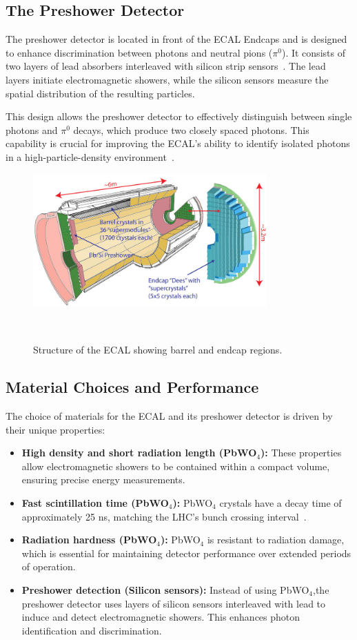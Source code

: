\subsection{The Preshower Detector}
The preshower detector is located in front of the ECAL Endcaps and is designed to enhance discrimination between photons and neutral pions ($\pi^0$). It consists of two layers of lead absorbers interleaved with silicon strip sensors~\cite{ecal_tdr_preshower}. The lead layers initiate electromagnetic showers, while the silicon sensors measure the spatial distribution of the resulting particles.

This design allows the preshower detector to effectively distinguish between single photons and $\pi^0$ decays, which produce two closely spaced photons. This capability is crucial for improving the ECAL’s ability to identify isolated photons in a high-particle-density environment~\cite{ecal_tdr_preshower}.

\begin{figure}[ht]
\centering
\includegraphics[width=0.8\textwidth]{Figures/ECAL Schematic Overview.png} %
\caption{Structure of the ECAL showing barrel and endcap regions.}~\cite{ECAL}
\label{fig:ecal}
\end{figure}

\subsection{Material Choices and Performance}
The choice of materials for the ECAL and its preshower detector is driven by their unique properties:
\begin{itemize}
\item \textbf{High density and short radiation length (PbWO$_4$):} These properties allow electromagnetic showers to be contained within a compact volume, ensuring precise energy measurements.
\item \textbf{Fast scintillation time (PbWO$_4$):} PbWO$_4$ crystals have a decay time of approximately 25 ns, matching the LHC’s bunch crossing interval~\cite{ecal_tdr}.
\item \textbf{Radiation hardness (PbWO$_4$):} PbWO$_4$ is resistant to radiation damage, which is essential for maintaining detector performance over extended periods of operation.
\item \textbf{Preshower detection (Silicon sensors):} Instead of using PbWO$_4$,the preshower detector uses layers of silicon sensors interleaved with lead to induce and detect electromagnetic showers. This enhances photon identification and discrimination.
\end{itemize}

